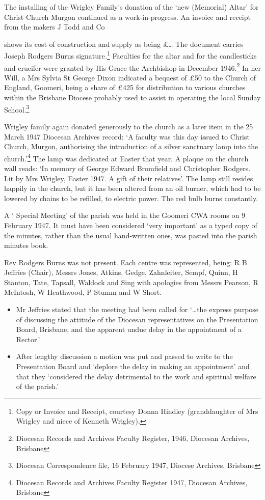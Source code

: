 The installing of the Wrigley Family's donation of the `new (Memorial)
Altar' for Christ Church Murgon continued as a work-in-progress. An
invoice and receipt from the makers J Todd and Co

shows its cost of construction and supply as being \pounds\ldots{} The
document carries Joseph Rodgers Burns signature\emph{.}\footnote{Copy or
  Invoice and Receipt, courtesy Donna Hindley (granddaughter of Mrs
  Wrigley and niece of Kenneth Wrigley).} Faculties for the altar and
for the candlesticks and crucifer were granted by His Grace the
Archbishop in December 1946.\footnote{Diocesan Records and Archives
  Faculty Register, 1946, Diocesan Archives, Brisbane} In her Will, a
Mrs Sylvia St George Dixon indicated a bequest of \pounds50 to the Church of
England, Goomeri, being a share of \pounds425 for distribution to various
churches within the Brisbane Diocese probably used to assist in
operating the local Sunday School.\footnote{Diocesan Correspondence
  file, 16 February 1947, Diocese Archives, Brisbane}

Wrigley family again donated generously to the church as a later item in
the 25 March 1947 Diocesan Archives record: `A faculty was this day
issued to Christ Church, Murgon, authorising the introduction of a
silver sanctuary lamp into the church.'\footnote{Diocesan Records and
  Archives Faculty Register 1947, Diocesan Archives, Brisbane} The lamp
was dedicated at Easter that year. A plaque on the church wall reads:
`In memory of George Edward Bromfield and Christopher Rodgers. Lit by
Mrs Wrigley, Easter 1947. A gift of their relatives'. The lamp still
resides happily in the church, but it has been altered from an oil
burner, which had to be lowered by chains to be refilled, to electric
power. The red bulb burns constantly.

A ` Special Meeting' of the parish was held in the Goomeri CWA rooms on
9 February 1947. It must have been considered `very important' as a
typed copy of the minutes, rather than the usual hand-written ones, was
pasted into the parish minutes book.

Rev Rodgers Burns was not present. Each centre was represented, being: R
B Jeffries (Chair), Messrs Jones, Atkins, Gedge, Zahnleiter, Sempf,
Quinn, H Stanton, Tate, Tapsall, Waldock and Sing with apologies from
Messrs Pearson, R McIntosh, W Heathwood, P Stumm and W Short.

\begin{itemize}
\item
  Mr Jeffries stated that the meeting had been called for `\ldots the
  express purpose of discussing the attitude of the Diocesan
  representatives on the Presentation Board, Brisbane, and the apparent
  undue delay in the appointment of a Rector.'
\item
  After lengthy discussion a motion was put and passed to write to the
  Presentation Board and `deplore the delay in making an appointment'
  and that they `considered the delay detrimental to the work and
  spiritual welfare of the parish.'
\end{itemize}

